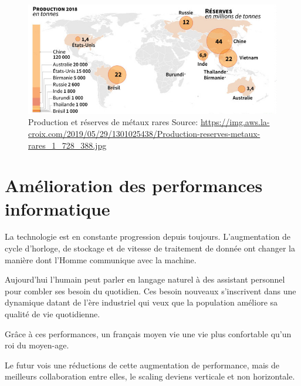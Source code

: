 \begin{figure}
  \centering
  \includegraphics[scale=0.5]{media/terres_rares.jpg}
  \caption{
    Production et réserves de métaux rares\newline
      \tiny{Source:\newline
        \url{https://img.aws.la-croix.com/2019/05/29/1301025438/Production-reserves-metaux-rares_1_728_388.jpg}
      }
  }
  \label{fig:terre_rare}
\end{figure}

\section{Amélioration des performances informatique}

La technologie est en constante progression depuis toujours.
L'augmentation de cycle d'horloge, de stockage et de vitesse de traitement de donnée
ont changer la manière dont l'Homme communique avec la machine.

Aujourd'hui l'humain peut parler en langage naturel à des assistant personnel pour combler ses
besoin du quotidien. 
Ces besoin nouveaux s'inscrivent dans une dynamique datant de l'ère industriel qui veux que
la population améliore sa qualité de vie quotidienne.

Grâce à ces performances, un français moyen vie une vie plus confortable qu'un roi 
du moyen-age.

Le futur vois une réductions de cette augmentation de performance, mais de meilleurs collaboration
entre elles, le scaling deviens verticale et non horizontale.



